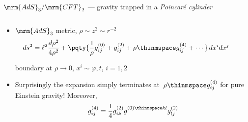 \documentclass[
	10pt
	,handout
	,noamsthm
]{beamer}
\begin{document}
\begin{frame}{$\mrm{AdS}_3/\mrm{CFT}_2$ --- gravity trapped in a \textit{Poincar\'e cylinder}}{%
	\textcite{Aharony:1999ti}
}
\begin{columns}
\figAdsCft
\begin{column}{.75\textwidth}
	\begin{itemize}
	\item $\mrm{AdS}_3$ metric, $\rho \sim z^2 \sim r^{-2}$
	\begin{equation}
	\hspace{-2em}
		ds^2 = \ell^2 \frac{d\rho^2}{4 \rho^2} + \pqty{\frac{1}{\rho} g^{(0)}_{ij} + g^{(2)}_{ij} + \rho\thinmspace g^{(4)}_{ij} + \cdots}\, dx^i dx^j \label{fggauge}
	\end{equation}
	
	\vspace{-.5\baselineskip}
	boundary at $\rho \to 0$, $x^{i} \sim \varphi, t$, $i = 1,2$

\pause
	\item Surprisingly the expansion simply terminates at~$\rho\thinmspace g^{(4)}_{ij}$ for pure Einstein gravity! Moreover,
	\begin{equation}
		g^{(4)}_{ij} = \frac{1}{4} g^{(2)}_{ik} g^{(0)\thinmspace kl}_{\phantom{kl}} g^{(2)}_{lj}
	\end{equation}
	\textcite{Fefferman:2007rka,Banados:1998gg}
	\end{itemize}
\end{column}
\end{columns}
\end{frame}

\newcommand{\eqBanados}{
	\begin{equation*}
	\hspace{-2em}
		ds^2 = \ell^2 \bigg( \frac{d\rho^2}{4 \rho^2} + \frac{ \big( du + \rho \, \mathcal {\bar L}(v)\, dv \big) \big( dv + \rho \, \mathcal L(u)\, du \big) }{\rho} \bigg)\ \,
	\end{equation*}
}
\end{document}
